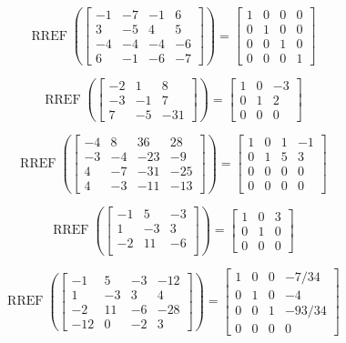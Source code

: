 \documentclass{article}
\DeclareMathOperator{\RREF}{RREF}
\begin{document}
\[\RREF\left(\begin{bmatrix} 
-1 & -7 & -1 & 6 \\ 
3 & -5 & 4 & 5 \\ 
-4 & -4 & -4 & -6 
\\ 6 & -1 & -6 & -7
 \end{bmatrix} \right) 
 =\begin{bmatrix} 1 & 0 & 0 & 0 \\ 0 & 1 & 0 & 0 \\ 0 & 0 & 1 & 0 \\ 0 & 0 & 0 & 1 \end{bmatrix}\]
 
 
 \[\RREF\left(\begin{bmatrix} 
 -2 & 1 & 8  \\ 
 -3 & -1 & 7  \\ 
 7 & -5 & -31  
 \end{bmatrix} \right) 
 = 
\begin{bmatrix} 1 & 0 & -3  \\ 0 & 1 & 2  \\ 0 & 0 & 0 \end{bmatrix}\]


\[\RREF\left(\begin{bmatrix} 
-4 & 8 & 36 & 28 \\ 
-3 & -4 & -23 & -9 \\ 
4 & -7 & -31 & -25 \\ 
4 & -3 & -11 & -13
 \end{bmatrix}\right) 
= \begin{bmatrix} 1 & 0 & 1 & -1 \\ 0 & 1 & 5 & 3 \\ 0 & 0 & 0 & 0 \\ 0 & 0 & 0 & 0  \end{bmatrix}\]

   \[\RREF\left(
    \begin{bmatrix}
      -1 & 5 & -3 \\
      1 & -3 & 3 \\
      -2 & 11 & -6 \\
    \end{bmatrix} \right)= \begin{bmatrix}
      1 & 0 & 3\\
      0 & 1 & 0 \\
      0 & 0 & 0 
    \end{bmatrix}
  \]
  
  
      \[\RREF\left(
    \begin{bmatrix}
      -1 & 5 & -3 & -12 \\
      1 & -3 & 3 & 4\\
      -2 & 11 & -6 & -28\\
      -12 & 0 & -2 &3
    \end{bmatrix} \right)= \begin{bmatrix}
      1 & 0 & 0 & -7/34\\
      0 & 1 & 0 & -4 \\
      0 & 0 & 1 & -93/34\\
      0 & 0 & 0 & 0
    \end{bmatrix}
  \]
  
\end{document}
